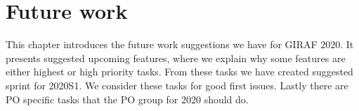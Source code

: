 \chapter{Future work}
This chapter introduces the future work suggestions we have for GIRAF 2020. 
It presents suggested upcoming features, where we explain why some features are either highest or high priority tasks.
From these tasks we have created suggested sprint for 2020S1.
We consider these tasks for good first issues.
Lastly there are PO specific tasks that the PO group for 2020 should do.



